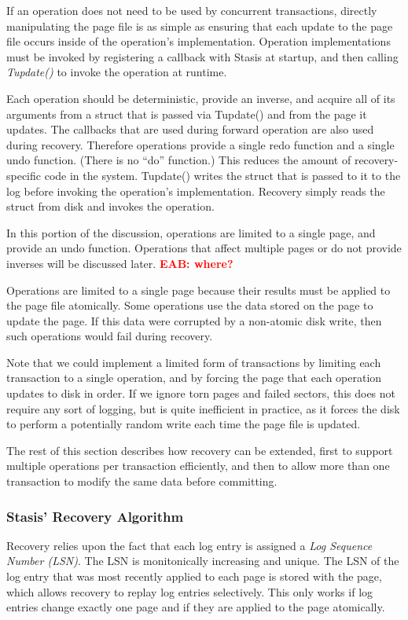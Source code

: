 \documentclass[letterpaper,twocolumn,10pt]{article}
\newcommand{\yad}{Stasis\xspace}
\newcommand{\yads}{Stasis'\xspace}
\newcommand{\eab}[1]{\textcolor{red}{\bf EAB: #1}}
\begin{document}
If an operation does not need to be used by concurrent
transactions, directly manipulating the page file is as simple as
ensuring that each update to the page file occurs inside of the
operation's implementation.  Operation implementations must be invoked
by registering a callback with \yad at startup, and then calling {\em
Tupdate()} to invoke the operation at runtime.  

Each operation should be deterministic, provide an inverse, and
acquire all of its arguments from a struct that is passed via
Tupdate() and from the page it updates.  The callbacks that are used
during forward operation are also used during recovery.  Therefore
operations provide a single redo function and a single undo function.
(There is no ``do'' function.)  This reduces the amount of
recovery-specific code in the system.  Tupdate() writes the struct
that is passed to it to the log before invoking the operation's
implementation.  Recovery simply reads the struct from disk and invokes the operation.

In this portion of the discussion, operations are limited to a single
page, and provide an undo function.  Operations that affect multiple
pages or do not provide inverses will be discussed later. \eab{where?}

Operations are limited to a single page because their results must be
applied to the page file atomically.  Some operations use the data
stored on the page to update the page.  If this data were corrupted by
a non-atomic disk write, then such operations would fail during recovery.

Note that we could implement a limited form of transactions by
limiting each transaction to a single operation, and by forcing the
page that each operation updates to disk in order.  If we ignore torn
pages and failed sectors, this does not require any sort of logging,
but is quite inefficient in practice, as it forces the disk to perform
a potentially random write each time the page file is updated.

The rest of this section describes how recovery can be extended,
first to support multiple operations per transaction efficiently, and
then to allow more than one transaction to modify the same data before
committing.

\subsubsection{\yads Recovery Algorithm}

Recovery relies upon the fact that each log entry is assigned a {\em
Log Sequence Number (LSN)}.  The LSN is monitonically increasing and
unique.  The LSN of the log entry that was most recently applied to
each page is stored with the page, which allows recovery to replay log entries selectively.  This only works if log entries change exactly one
page and if they are applied to the page atomically.
\end{document}
